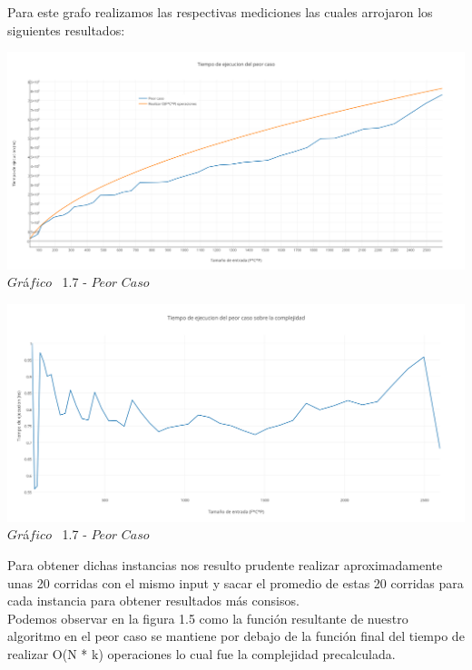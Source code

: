 Para este grafo realizamos las respectivas mediciones las cuales arrojaron los siguientes resultados:\\


\vspace*{0.3cm} \vspace*{0.3cm}
  \begin{center}
\includegraphics[scale=0.65]{./EJ1/peorcaso.png}
{$Gr$\'a$fico$ \ 1.7 - $Peor$ $Caso$}
  \end{center}
  \vspace*{0.3cm}


\vspace*{0.3cm} \vspace*{0.3cm}
  \begin{center}
\includegraphics[scale=0.65]{./EJ1/peorcaso1.png}
{$Gr$\'a$fico$ \ 1.7 - $Peor$ $Caso$}
  \end{center}
  \vspace*{0.3cm}

 Para obtener dichas instancias nos resulto prudente realizar aproximadamente unas 20 corridas con el mismo input y sacar el promedio de estas 20 corridas para cada instancia para obtener resultados m\'as consisos.\\ 

Podemos observar en la figura 1.5 como la funci\'on resultante de nuestro algoritmo en el peor caso se mantiene por debajo de la funci\'on final del tiempo de realizar O(N * k) operaciones lo cual fue la complejidad precalculada.\\

